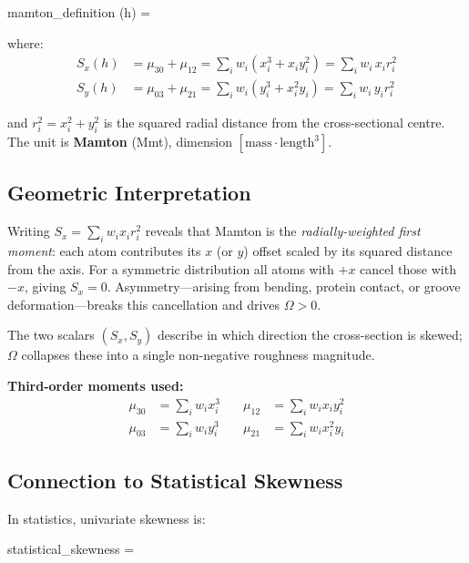 \begin{keyresult}
\begin{beq}{mamton_definition}
    \Omega(h) = 
\end{beq}

where:
\begin{align}
    S_x(h) &= \mu_{30} + \mu_{12} = \sum_{i} w_i (x_i^3 + x_i y_i^2) = \sum_{i} w_i \, x_i r_i^2 \\
    S_y(h) &= \mu_{03} + \mu_{21} = \sum_{i} w_i (y_i^3 + x_i^2 y_i) = \sum_{i} w_i \, y_i r_i^2
\end{align}

and $r_i^2 = x_i^2 + y_i^2$ is the squared radial distance from the cross-sectional centre. The unit is \textbf{Mamton} (Mmt), dimension $[\text{mass} \cdot \text{length}^3]$.
\end{keyresult}

\subsection{Geometric Interpretation}

Writing $S_x = \sum_i w_i x_i r_i^2$ reveals that Mamton is the \emph{radially-weighted first moment}: each atom contributes its $x$ (or $y$) offset scaled by its squared distance from the axis. For a symmetric distribution all atoms with $+x$ cancel those with $-x$, giving $S_x = 0$. Asymmetry---arising from bending, protein contact, or groove deformation---breaks this cancellation and drives $\Omega > 0$.

The two scalars $(S_x, S_y)$ describe in which direction the cross-section is skewed; $\Omega$ collapses these into a single non-negative roughness magnitude.

\textbf{Third-order moments used:}
\begin{align}
    \mu_{30} &= \sum_i w_i x_i^3 &\quad \mu_{12} &= \sum_i w_i x_i y_i^2 \\
    \mu_{03} &= \sum_i w_i y_i^3 &\quad \mu_{21} &= \sum_i w_i x_i^2 y_i
\end{align}

\subsection{Connection to Statistical Skewness}

In statistics, univariate skewness is:

\begin{beq}{statistical_skewness}
    \gamma = 
\end{beq}

